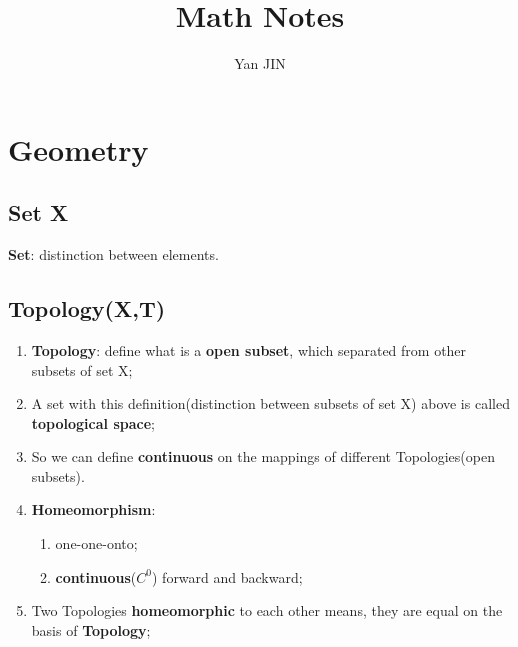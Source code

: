 \documentclass[12pt]{article}
\numberwithin{equation}{section}
\begin{document}
\small
\title{Math Notes}
\author{Yan JIN}
\pagestyle{fancy}\fancyhf{}
\lhead{}
\lfoot{\textit{}}\cfoot{}\rfoot{\thepage}
\renewcommand{\headrulewidth}{1.pt}
\renewcommand{\footrulewidth}{1.pt}
\maketitle
\tableofcontents
\section{Geometry}
\subsection{Set X}
	\textbf{Set}: distinction between elements.
\subsection{Topology(X,T)}
	\begin{enumerate}
	\item \textbf{Topology}: define what is a \textbf{open subset}, which separated from other subsets of set X;
	\item A set with this definition(distinction between subsets of set X) above is called \textbf{topological space};
	\item So we can define \textbf{continuous} on the mappings of different Topologies(open subsets).
	\item \textbf{Homeomorphism}: 
		\begin{enumerate}
			\item one-one-onto; 
			\item \textbf{continuous}($C^0$) forward and backward;
		\end{enumerate}
	\item Two Topologies \textbf{homeomorphic} to each other means, they are equal on the basis of 	\textbf{Topology};
	\end{enumerate}
\end{document}
